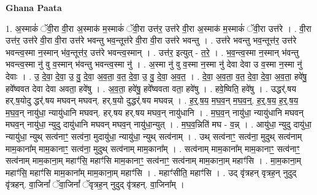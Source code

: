 \documentclass[17pt]{extarticle}
\begin{document}
\textbf{Ghana Paata } \newline

1. अ॒स्माकं॑ ॅवी॒रा वी॒रा अ॒स्माक॑ म॒स्माकं॑ ॅवी॒रा उत्त॑र॒ उत्त॑रे वी॒रा अ॒स्माक॑ म॒स्माकं॑ ॅवी॒रा उत्त॑रे । . वी॒रा उत्त॑र॒ उत्त॑रे वी॒रा वी॒रा उत्त॑रे भवन्तु भव॒न्तूत्त॑रे वी॒रा वी॒रा उत्त॑रे भवन्तु । . उत्त॑रे भवन्तु भव॒न्तूत्त॑र॒ उत्त॑रे भवन्त्व॒स्मा न॒स्मान् भ॑व॒न्तूत्त॑र॒ उत्त॑रे भवन्त्व॒स्मान् । . उत्त॑र॒ इत्युत् - त॒रे॒ । . भ॒व॒न्त्व॒स्मा न॒स्मान् भ॑वन्तु भवन्त्व॒स्मा नु॑ वु व॒स्मान् भ॑वन्तु भवन्त्व॒स्मा नु॑ । . अ॒स्मा नु॑ वु व॒स्मा न॒स्मा नु॑ देवा देवा उ व॒स्मा न॒स्मा नु॑ देवाः । . उ॒ दे॒वा॒ दे॒वा॒ उ॒ वु॒ दे॒वा॒ अ॒व॒ता॒ व॒त॒ दे॒वा॒ उ॒ वु॒ दे॒वा॒ अ॒व॒त॒ । . दे॒वा॒ अ॒व॒ता॒ व॒त॒ दे॒वा॒ दे॒वा॒ अ॒व॒ता॒ हवे॑षु॒ हवे᳚ष्ववत देवा देवा अवता॒ हवे॑षु । . अ॒व॒ता॒ हवे॑षु॒ हवे᳚ष्ववता वता॒ हवे॑षु । . हवे॒ष्विति॒ हवे॑षु । . उद्धर्॑.षय हर्.ष॒योदु द्धर्॑.षय मघवन् मघवन्. हर्.ष॒यो दुद्धर्॑.षय मघवन्न् । . ह॒र्॒.ष॒य॒ म॒घ॒व॒न् म॒घ॒व॒न्॒. ह॒र्॒.ष॒य॒ ह॒र्॒.ष॒य॒ म॒घ॒व॒न् नायु॑धा॒ न्यायु॑धानि मघवन्. हर्.षय हर्.षय मघव॒न् नायु॑धानि । . म॒घ॒व॒न् नायु॑धा॒ न्यायु॑धानि मघवन् मघव॒न् नायु॑धा॒ न्युदु दायु॑धानि मघवन् मघव॒न् नायु॑धा॒न्युत् । . म॒घ॒व॒न्निति॑ मघ - व॒न्न् । . आयु॑धा॒ न्युदु दायु॑धा॒ न्यायु॑धा॒ न्युथ् सत्व॑नाꣳ॒॒ सत्व॑ना॒ मुदायु॑धा॒ न्यायु॑धा॒ न्युथ् सत्व॑नाम् । . उथ् सत्व॑नाꣳ॒॒ सत्व॑ना॒ मुदुथ् सत्व॑नाम् माम॒काना᳚म् माम॒कानाꣳ॒॒ सत्व॑ना॒ मुदुथ् सत्व॑नाम् माम॒काना᳚म् । . सत्व॑नाम् माम॒काना᳚म् माम॒कानाꣳ॒॒ सत्व॑नाꣳ॒॒ सत्व॑नाम् माम॒काना॒म् महाꣳ॑सि॒ महाꣳ॑सि माम॒कानाꣳ॒॒ सत्व॑नाꣳ॒॒ सत्व॑नाम् माम॒काना॒म् महाꣳ॑सि । . मा॒म॒काना॒म् महाꣳ॑सि॒ महाꣳ॑सि माम॒काना᳚म् माम॒काना॒म् महाꣳ॑सि । . महाꣳ॑सीति॒ महाꣳ॑सि । . उद् वृ॑त्रहन् वृत्रह॒न् नुदुद् वृ॑त्रहन्. वा॒जिनां᳚ ॅवा॒जिनां᳚ ॅवृत्रह॒न् नुदुद् वृ॑त्रहन्. वा॒जिना᳚म् । \newline
\end{document}
